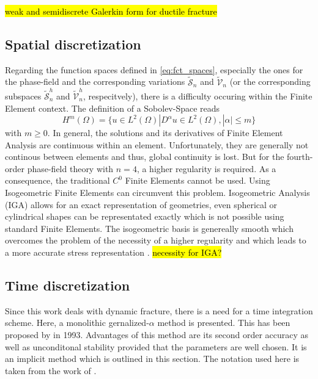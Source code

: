 \hl{weak and semidiscrete Galerkin form for ductile fracture}

\subsection{Spatial discretization} \label{sec:space_discr}
Regarding the function spaces defined in \eqref{eq:fct_spaces}, especially the ones for the phase-field and the corresponding variations $\tilde{\mathcal{S}}_{n}$ and $\tilde{\mathcal{V}}_{n}$ (or the corresponding subspaces $\tilde{\mathcal{S}}_{n}^{h}$ and $\tilde{\mathcal{V}}_{n}^{h}$, respecitvely), there is a difficulty occuring within the Finite Element context. The definition of a Sobolev-Space reads
\begin{equation} \label{eq:Hilbertspace}
	H^{m}\left(\Omega\right) = \{u\in L^{2}\left(\Omega\right)|D^{\alpha}u\in L^{2}\left(\Omega\right),|\alpha|\leq m\}
\end{equation}
with $m\geq0$. In general, the solutions and its derivatives of Finite Element Analysis are continuous within an element. Unfortunately, they are generally not continous between elements and thus, global continuity is lost. But for the fourth-order phase-field theory with $n=4$, a higher regularity is required. As a consequence, the traditional $C^{0}$ Finite Elements cannot be used. Using Isogeometric Finite Elements can circumvent this problem. Isogeometric Analysis (IGA) allows for an exact representation of geometries, even spherical or cylindrical shapes can be representated exactly which is not possible using standard Finite Elements. The isogeometric basis is genereally smooth which overcomes the problem of the necessity of a higher regularity and which leads to a more accurate stress representation \cite{01_PF_dyn_brittle}.
\hl{necessity for IGA?}

\subsection{Time discretization} \label{sec:time_discr}
Since this work deals with dynamic fracture, there is a need for a time integration scheme. Here, a monolithic gernalized-$\alpha$ method is presented. This has been proposed by \citet{10_PF_genAlpha} in 1993. Advantages of this method are its second order accuracy as well as unconditonal stability provided that the parameters are well chosen. It is an implicit method which is outlined in this section. The notation used here is taken from the work of \citet{01_PF_dyn_brittle}.

